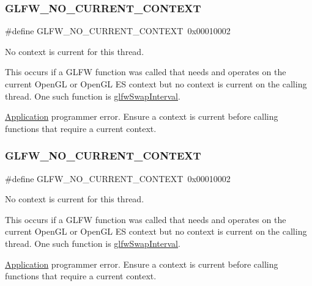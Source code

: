 \subsubsection{\texorpdfstring{G\+L\+F\+W\+\_\+\+N\+O\+\_\+\+C\+U\+R\+R\+E\+N\+T\+\_\+\+C\+O\+N\+T\+E\+XT}{GLFW\_NO\_CURRENT\_CONTEXT}\hspace{0.1cm}{\footnotesize\ttfamily [4/5]}}
{\footnotesize\ttfamily \#define G\+L\+F\+W\+\_\+\+N\+O\+\_\+\+C\+U\+R\+R\+E\+N\+T\+\_\+\+C\+O\+N\+T\+E\+XT~0x00010002}



No context is current for this thread. 

This occurs if a G\+L\+FW function was called that needs and operates on the current Open\+GL or Open\+GL ES context but no context is current on the calling thread. One such function is \hyperlink{group__context_ga12a595c06947cec4967c6e1f14210a8a}{glfw\+Swap\+Interval}.

\hyperlink{classApplication}{Application} programmer error. Ensure a context is current before calling functions that require a current context. \mbox{\label{group__errors_gaa8290386e9528ccb9e42a3a4e16fc0d0}} 
\subsubsection{\texorpdfstring{G\+L\+F\+W\+\_\+\+N\+O\+\_\+\+C\+U\+R\+R\+E\+N\+T\+\_\+\+C\+O\+N\+T\+E\+XT}{GLFW\_NO\_CURRENT\_CONTEXT}\hspace{0.1cm}{\footnotesize\ttfamily [5/5]}}
{\footnotesize\ttfamily \#define G\+L\+F\+W\+\_\+\+N\+O\+\_\+\+C\+U\+R\+R\+E\+N\+T\+\_\+\+C\+O\+N\+T\+E\+XT~0x00010002}



No context is current for this thread. 

This occurs if a G\+L\+FW function was called that needs and operates on the current Open\+GL or Open\+GL ES context but no context is current on the calling thread. One such function is \hyperlink{group__context_ga12a595c06947cec4967c6e1f14210a8a}{glfw\+Swap\+Interval}.

\hyperlink{classApplication}{Application} programmer error. Ensure a context is current before calling functions that require a current context. \mbox{\label{group__errors_gacff24d2757da752ae4c80bf452356487}} 
